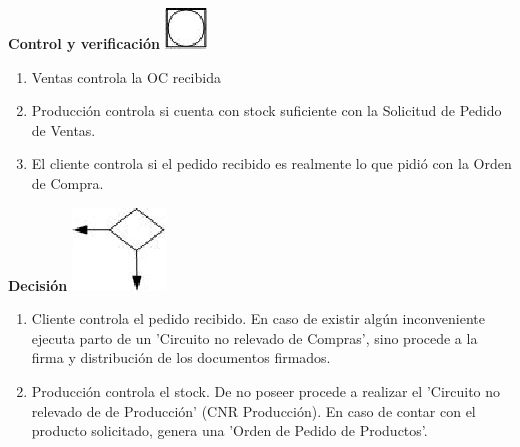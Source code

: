 \begin{center}
  \textbf{Control y verificaci\'on}
  \includegraphics{./Images/Simbolos/simbolo-Control-y-Verificacion.png}
\end{center}
\begin{enumerate}
	\item Ventas controla la OC recibida
	\item Producci\'on controla si cuenta con stock suficiente con la Solicitud de Pedido de Ventas.
	\item El cliente controla si el pedido recibido es realmente lo que pidi\'o con la Orden de Compra.
\end{enumerate}
\pagebreak

\begin{center}
  \textbf{Decisi\'on}
  \includegraphics{./Images/Simbolos/simbolo-Decision.png}
\end{center}
\begin{enumerate}
  \item Cliente controla el pedido recibido. En caso de existir alg\'un inconveniente ejecuta parto de un 'Circuito no relevado de Compras', sino procede a la firma y distribuci\'on de los documentos firmados.
  \item Producci\'on controla el stock. De no poseer procede a realizar el 'Circuito no relevado de de Producci\'on' (CNR Producci\'on). En caso de contar con el producto solicitado, genera una 'Orden de Pedido de Productos'.

\end{enumerate}

